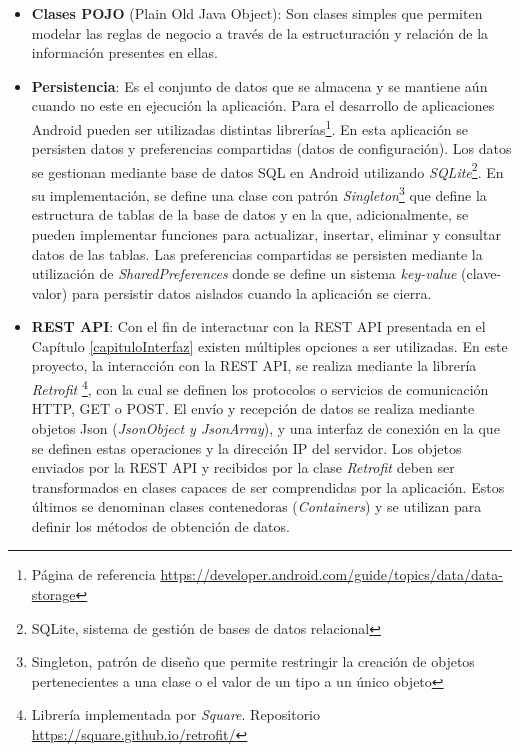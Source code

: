      \begin{itemize}
         \item \textbf{Clases POJO} (Plain Old Java Object): Son clases simples que permiten modelar las reglas de negocio a través de la estructuración y relación de la información presentes en ellas.
         
         
         \item \textbf{Persistencia}: Es el conjunto de datos que se almacena y se mantiene aún cuando no este en ejecución la aplicación. Para el desarrollo de aplicaciones Android pueden ser utilizadas distintas librerías\footnote{Página de referencia \url{https://developer.android.com/guide/topics/data/data-storage}}. En esta aplicación se persisten datos y preferencias compartidas (datos de configuración). Los datos se gestionan mediante base de datos SQL en Android utilizando \textit{SQLite}\footnote{SQLite, sistema de gestión de bases de datos relacional}. En su implementación, se define una clase con patrón \textit{Singleton}\footnote{Singleton, patrón de diseño que permite restringir la creación de objetos pertenecientes a una clase o el valor de un tipo a un único objeto} que define la estructura de tablas de la base de datos y en la que, adicionalmente, se pueden implementar funciones para actualizar, insertar, eliminar y consultar datos de las tablas. Las preferencias compartidas se persisten mediante la utilización de \textit{SharedPreferences} donde se define un sistema \textit{key-value} (clave-valor) para persistir datos aislados cuando la aplicación se cierra.
         
         \item \textbf{REST API}: Con el fin de interactuar con la REST API presentada en el Capítulo \ref{capituloInterfaz} existen múltiples opciones a ser utilizadas. En este proyecto, la interacción con la REST API, se realiza mediante la librería \textit{Retrofit} \footnote{Librería implementada por \textit{Square}. Repositorio \url{https://square.github.io/retrofit/}}, con la cual se definen los protocolos o servicios de comunicación HTTP, GET o POST. El envío y recepción de datos se realiza mediante objetos Json (\textit{JsonObject y JsonArray}), y una interfaz de conexión en la que se definen estas operaciones y la dirección IP del servidor. Los objetos enviados por la REST API y recibidos por la clase \textit{Retrofit} deben ser transformados en clases capaces de ser comprendidas por la aplicación. Estos últimos se denominan clases contenedoras (\textit{Containers}) y se utilizan para  definir los métodos de obtención de datos.
        

\end{itemize}
